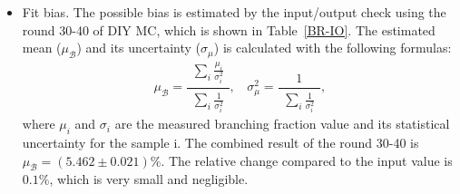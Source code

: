{\begin{itemize}
        \item Fit bias. The possible bias is estimated by the input/output check using the round 30-40 of DIY MC, which is shown in Table~\ref{BR-IO}. 
            The estimated mean ($\mu_{\mathcal{B}}$) and its uncertainty ($\sigma_{\mu}$) is calculated with the following formulas:
            \begin{equation}
            \mu_{\mathcal{B}} = \frac{\begin{matrix}\sum_{i}\frac{\mu_{i}}{\sigma_{i}^{2}}\end{matrix}}{\begin{matrix}\sum_{i}\frac{1}{\sigma_{i}^{2}}\end{matrix}}, \ \ \ \ \sigma_{\mu}^{2}=\frac{1}{\begin{matrix}\sum_{i}\frac{1}{\sigma_{i}^{2}}\end{matrix}},
            \label{BR-Combined}
            \end{equation}
            where $\mu_{i}$ and $\sigma_{i}$ are the measured branching fraction value and its statistical uncertainty for the sample i. The combined result of the round 30-40 is $\mu_{\mathcal{B}} = (5.462 \pm 0.021)\%$. 
            The relative change compared to the input value is $0.1\%$, which is very small and negligible.


\end{itemize}}
